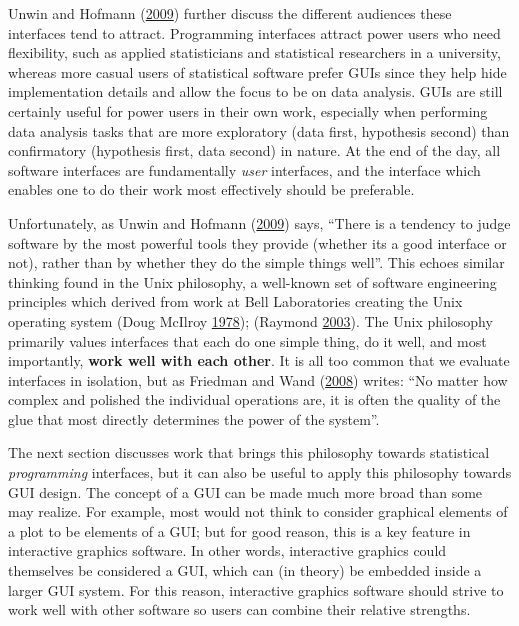 \documentclass[12pt,]{isuthesis}
\begin{document}
Unwin and Hofmann (\protect\hyperlink{ref-Unwin:1999vp}{2009}) further
discuss the different audiences these interfaces tend to attract.
Programming interfaces attract power users who need flexibility, such as
applied statisticians and statistical researchers in a university,
whereas more casual users of statistical software prefer GUIs since they
help hide implementation details and allow the focus to be on data
analysis. GUIs are still certainly useful for power users in their own
work, especially when performing data analysis tasks that are more
exploratory (data first, hypothesis second) than confirmatory
(hypothesis first, data second) in nature. At the end of the day, all
software interfaces are fundamentally \emph{user} interfaces, and the
interface which enables one to do their work most effectively should be
preferable.

Unfortunately, as Unwin and Hofmann
(\protect\hyperlink{ref-Unwin:1999vp}{2009}) says, ``There is a tendency
to judge software by the most powerful tools they provide (whether its a
good interface or not), rather than by whether they do the simple things
well''. This echoes similar thinking found in the Unix philosophy, a
well-known set of software engineering principles which derived from
work at Bell Laboratories creating the Unix operating system (Doug
McIlroy \protect\hyperlink{ref-unix}{1978}); (Raymond
\protect\hyperlink{ref-unix-philosophy}{2003}). The Unix philosophy
primarily values interfaces that each do one simple thing, do it well,
and most importantly, \textbf{work well with each other}. It is all too
common that we evaluate interfaces in isolation, but as Friedman and
Wand (\protect\hyperlink{ref-eopl}{2008}) writes: ``No matter how
complex and polished the individual operations are, it is often the
quality of the glue that most directly determines the power of the
system''.

The next section discusses work that brings this philosophy towards
statistical \emph{programming} interfaces, but it can also be useful to
apply this philosophy towards GUI design. The concept of a GUI can be
made much more broad than some may realize. For example, most would not
think to consider graphical elements of a plot to be elements of a GUI;
but for good reason, this is a key feature in interactive graphics
software. In other words, interactive graphics could themselves be
considered a GUI, which can (in theory) be embedded inside a larger GUI
system. For this reason, interactive graphics software should strive to
work well with other software so users can combine their relative
strengths.
\end{document}
